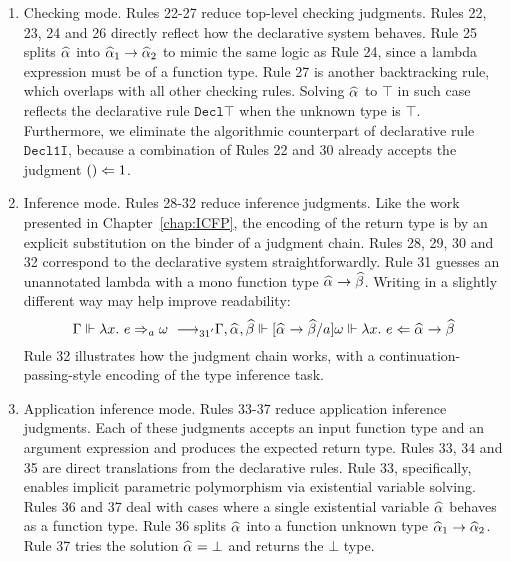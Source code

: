 \begin{enumerate}
    \item Checking mode. Rules 22-27 reduce top-level checking judgments.
            Rules 22, 23, 24 and 26 directly reflect how the declarative system behaves.
            Rule 25 splits $\al$ into $\al[1] \to \al[2]$ to mimic the same logic as Rule 24,
            since a lambda expression must be of a function type.
            Rule 27 is another backtracking rule, which overlaps with all other checking rules.
            Solving $\al$ to $\top$ in such case reflects
            the declarative rule $\mathtt{Decl{\top}}$ when the unknown type is $\top$.
            Furthermore, we eliminate the algorithmic counterpart of declarative rule
            $\mathtt{Decl1I}$, because a combination of Rules 22 and 30 already
            accepts the judgment $() \Leftarrow 1$.
    
    \item Inference mode. Rules 28-32 reduce inference judgments.
            Like the work presented in Chapter~\ref{chap:ICFP}, the encoding of the return type is by
            an explicit substitution on the binder of a judgment chain.
            Rules 28, 29, 30 and 32 correspond to the declarative system straightforwardly.
            Rule 31 guesses an unannotated lambda with a mono function type $\al \to \bt$.
            Writing in a slightly different way may help improve readability:
            \[ \Gm \Vdash \lam e \To_a \jg \rrule{31'}
                \Gm, \al, \bt \Vdash [\al \to \bt / a]\jg \Vdash \lam e \Lto \al \to \bt \]
            Rule 32 illustrates how the judgment chain works, with a continuation-passing-style
            encoding of the type inference task.
    
    \item Application inference mode. Rules 33-37 reduce application inference judgments.
            Each of these judgments accepts an input function type and an argument expression
            and produces the expected return type.
            Rules 33, 34 and 35 are direct translations from the declarative rules.
            Rule 33, specifically, enables implicit parametric polymorphism via
            existential variable solving.
            Rules 36 and 37 deal with cases where a single existential variable
            $\al$ behaves as a function type.
            Rule 36 splits $\al$ into a function unknown type $\al[1] \to \al[2]$.
            Rule 37 tries the solution $\al = \bot$ and returns the $\bot$ type.


\end{enumerate}

